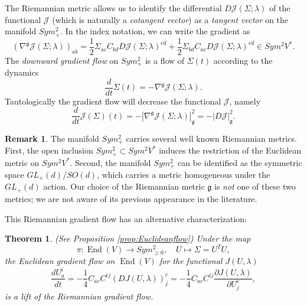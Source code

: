 \documentclass[a4paper]{article}
\newtheorem{thm}{Theorem}[section]
\theoremstyle{definition}
\newtheorem{rmk}{Remark}
\newcommand{\1}{\mathbbm{1}}
\DeclareMathOperator{\End}{End}
\begin{document}
	
	
	
	
	The Riemannian metric allows us to identify the differential $D\mathcal{J}(\Sigma;\lambda)$ of the functional $\mathcal{J}$ (which is naturally a \emph{cotangent vector}) as a \emph{tangent vector} on the manifold $Sym^2_+$.
	In the index notation, we can write the gradient as
	\[
	(\nabla^{\mathfrak{g}} \mathcal{J}(\Sigma;\lambda) )_{ab} = \frac{1}{2}\Sigma_{ac} C_{bd} D\mathcal{J}(\Sigma;\lambda)^{cd} + \frac{1}{2}\Sigma_{bd} C_{ac} D\mathcal{J}(\Sigma;\lambda)^{cd} \in Sym^2 V^*.
	\]
	The \emph{downward gradient flow} on $Sym^2_+$ is  a flow of $\Sigma(t)$ according to the dynamics
	\begin{equation}\label{eqn:gradientflow}
		\frac{d}{dt} \Sigma(t)= - \nabla^{\mathfrak{g}} \mathcal{J}(\Sigma;\lambda).
	\end{equation}
	Tautologically the gradient flow will decrease the functional $\mathcal{J}$, namely
	\begin{equation}\label{eqn:Jdecreases}
		\frac{d}{dt} \mathcal{J}(\Sigma) (t)= - |\nabla^{\mathfrak{g}} \mathcal{J}(\Sigma;\lambda)|^2_{\mathfrak{g}}=  -  |D\mathcal{J}|^2_{\mathfrak{g}}.
	\end{equation}
	
	
	
	
	
	
	
	
	\begin{rmk}
		The manifold $Sym^2_+ $ carries several well known  Riemannian metrics. First, the open inclusion $Sym^2_+\subset Sym^2V^*$ induces the restriction of the Euclidean metric on $Sym^2V^*$. Second, the manifold $Sym^2_+$ can be identified as the symmetric space $GL_+(d)/SO(d)$, which carries a metric homogeneous under the $GL_+(d)$ action. Our choice of the Riemannian metric $\mathfrak{g}$ is \emph{not} one of these two metrics; we are not aware of its previous appearance in the literature.
	\end{rmk}
	
	
	
	
	
	
	
	
	This Riemannian gradient flow has an alternative characterization:
	
	
	\begin{thm}
		(See Proposition \ref{prop:Euclideanflow})  Under the map 
		\[
		\pi: \End(V)\to Sym^2_{\geq 0}, \quad U\mapsto \Sigma=U^T U,
		\]
		the \emph{Euclidean gradient flow} on $\End(V)$ for the functional $J(U,\lambda)$
		\begin{equation}\label{eqn:Euclideanflow}
			\frac{dU_a^i}{dt}= - \frac{1}{4} C_{ac} C^{ij} (DJ(U,\lambda))_j^c  =  - \frac{1}{4} C_{ac} C^{ij}  \frac{\partial J(U,\lambda)}{\partial U_j^c}  ,
		\end{equation}
		is a lift of the Riemannian gradient flow.
	\end{thm}
	
\end{document}
